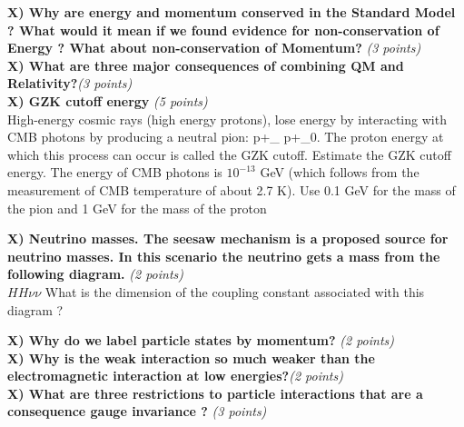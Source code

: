 {\large



\textbf{X) Why are energy and momentum conserved in the Standard Model ?  What would it mean if we found evidence for non-conservation of Energy ? What about non-conservation of Momentum? }\hfill \textit{(3 points)}\\

\textbf{X) What are three major consequences of combining QM and Relativity?}\hfill \textit{(3 points)}\\

\textbf{X)  GZK cutoff energy} \hfill \textit{(5 points)}\\
High-energy cosmic rays (high energy protons), lose energy by interacting with CMB photons by producing a neutral pion:
\be
p+\gamma_{} \rightarrow p+\pi_0.
\ee
The proton energy at which this process can occur is called the GZK cutoff. 
Estimate the GZK cutoff energy.
The energy of CMB photons is $10^{-13}$ GeV (which follows from the measurement of CMB temperature of about 2.7 K).
Use 0.1 GeV for the mass of the pion and 1 GeV for the mass of the proton
\vspace{5in}




\textbf{X) Neutrino masses. The seesaw mechanism is a proposed source for neutrino masses. In this scenario the neutrino gets a mass from the following diagram.} \hfill \textit{(2 points)}\\
$HH\nu\nu $
What is the dimension of the coupling constant associated with this diagram ?


\textbf{X) Why do we label particle states by momentum? } \hfill \textit{(2 points)}\\


\textbf{X) Why is the weak interaction so much weaker than the electromagnetic interaction at low energies?}\hfill \textit{(2 points)}\\



\textbf{X) What are three restrictions to particle interactions that are a consequence gauge invariance ? }\hfill \textit{(3 points)}\\



}
